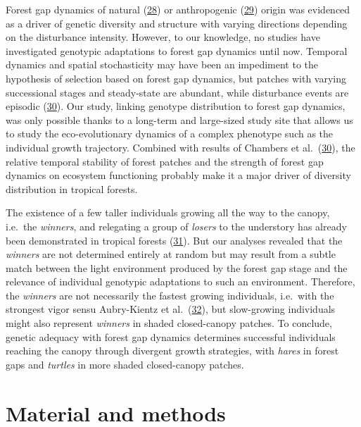 \documentclass[
]{article}
\begin{document}
Forest gap dynamics of natural (\protect\hyperlink{ref-Scotti2015}{28}) or anthropogenic (\protect\hyperlink{ref-Leclerc2015}{29}) origin was evidenced as a driver of genetic diversity and structure with varying directions depending on the disturbance intensity.
However, to our knowledge, no studies have investigated genotypic adaptations to forest gap dynamics until now.
Temporal dynamics and spatial stochasticity may have been an impediment to the hypothesis of selection based on forest gap dynamics,
but patches with varying successional stages and steady-state are abundant, while disturbance events are episodic (\protect\hyperlink{ref-Chambers2013}{30}).
Our study, linking genotype distribution to forest gap dynamics, was only possible thanks to a long-term and large-sized study site that allows us to study the eco-evolutionary dynamics of a complex phenotype such as the individual growth trajectory.
Combined with results of Chambers et al.~(\protect\hyperlink{ref-Chambers2013}{30}),
the relative temporal stability of forest patches and the strength of forest gap dynamics on ecosystem functioning probably make it a major driver of diversity distribution in tropical forests.

The existence of a few taller individuals growing all the way to the canopy, i.e.~the \emph{winners},
and relegating a group of \emph{losers} to the understory has already been demonstrated in tropical forests (\protect\hyperlink{ref-Farrior2016}{31}).
But our analyses revealed that the \emph{winners} are not determined entirely at random but may result from a subtle match between the light environment produced by the forest gap stage and the relevance of individual genotypic adaptations to such an environment.
Therefore, the \emph{winners} are not necessarily the fastest growing individuals, i.e.~with the strongest vigor sensu Aubry-Kientz et al.~(\protect\hyperlink{ref-Aubry-Kientz2015}{32}),
but slow-growing individuals might also represent \emph{winners} in shaded closed-canopy patches.
To conclude, genetic adequacy with forest gap dynamics determines successful individuals reaching the canopy through divergent growth strategies,
with \emph{hares} in forest gaps and \emph{turtles} in more shaded closed-canopy patches.

\hypertarget{material-and-methods}{%
\section{Material and methods}\label{material-and-methods}}
\end{document}
